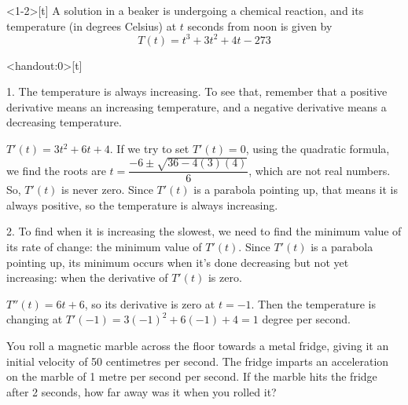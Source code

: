 \begin{frame}<1-2>[t]
\AnswerYes
{}
A solution in a beaker is undergoing a chemical reaction, and its temperature (in degrees Celsius) at $t$ seconds from noon is given by
\[T(t) = t^3+3t^2+4t-273\]
\end{frame}
\begin{frame}<handout:0>[t]\color{answercolor}

1. The temperature is always increasing. To see that, remember that a positive derivative means an increasing temperature, and a negative derivative means a decreasing temperature.\vfill

$T'(t)=3t^2+6t+4$. If we try to set $T'(t)=0$, using the quadratic formula, we find the roots are $t=\dfrac{-6\pm\sqrt{36-4(3)(4)}}{6}$, which are not real numbers. So, $T'(t)$ is never zero. Since $T'(t)$ is a parabola pointing up, that means it is always positive, so the temperature is always increasing.\vfill

2. To find when it is increasing the slowest, we need to find the minimum value of its rate of change: the minimum value of $T'(t)$. Since $T'(t)$ is a parabola pointing up, its minimum occurs when it's done decreasing but not yet increasing: when the derivative of $T'(t)$ is zero.\vfill

$T''(t)=6t+6$, so its derivative is zero at $t=-1$. Then the temperature is changing at $T'(-1)=3(-1)^2+6(-1)+4=1$ degree per second.
\end{frame}
\begin{frame}[t]
\AnswerYes
You roll a magnetic marble across the floor towards a metal fridge, giving it an initial velocity of 50 centimetres per second. The fridge imparts an acceleration on the marble of 1 metre per second per second. If the marble hits the fridge after 2 seconds, how far away was it when you rolled it?



\end{frame}
